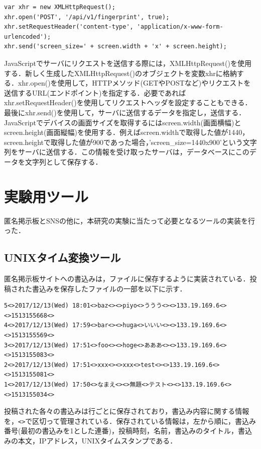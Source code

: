 \documentclass[10pt, a4paper]{jreport}
\begin{document}
\begin{lstlisting}[caption=画面サイズの取得とサーバへの送信,label=prog: fingerprint_js]
var xhr = new XMLHttpRequest();
xhr.open('POST', '/api/v1/fingerprint', true);
xhr.setRequestHeader('content-type', 'application/x-www-form-urlencoded');
xhr.send('screen_size=' + screen.width + 'x' + screen.height);
\end{lstlisting}

JavaScriptでサーバにリクエストを送信する際には，XMLHttpRequest()を使用する．新しく生成したXMLHttpRequest()のオブジェクトを変数xhrに格納する．xhr.open()を使用して，HTTPメソッド(GETやPOSTなど)やリクエストを送信するURL(エンドポイント)を指定する．必要であればxhr.setRequestHeader()を使用してリクエストヘッダを設定することもできる．最後にxhr.send()を使用して，サーバに送信するデータを指定し，送信する．JavaScriptでデバイスの画面サイズを取得するにはscreen.width(画面横幅)とscreen.height(画面縦幅)を使用する．例えばscreen.widthで取得した値が1440，screen.heightで取得した値が900であった場合，'screen\_size=1440x900'という文字列をサーバに送信する．この情報を受け取ったサーバは，データベースにこのデータを文字列として保存する．

\section{実験用ツール}
匿名掲示板とSNSの他に，本研究の実験に当たって必要となるツールの実装を行った．

\subsection{UNIXタイム変換ツール}\label{sec: unix_time_translation}
匿名掲示板サイトへの書込みは，ファイルに保存するように実装されている．投稿された書込みを保存したファイルの一部を以下に示す．

\begin{verbatim}
5<>2017/12/13(Wed) 18:01<>baz<><>piyo<>ううう<><>133.19.169.6<><>1513155668<>
4<>2017/12/13(Wed) 17:59<>bar<><>huga<>いいい<><>133.19.169.6<><>1513155569<>
3<>2017/12/13(Wed) 17:51<>foo<><>hoge<>あああ<><>133.19.169.6<><>1513155083<>
2<>2017/12/13(Wed) 17:51<>xxx<><>xxx<>test<><>133.19.169.6<><>1513155081<>
1<>2017/12/13(Wed) 17:50<>なまえ<><>無題<>テスト<><>133.19.169.6<><>1513155034<>
\end{verbatim}

投稿された各々の書込みは行ごとに保存されており，書込み内容に関する情報を，\verb|<>|で区切って管理されている．保存されている情報は，左から順に，書込み番号(最初の書込みを1とした連番)，投稿時刻，名前，書込みのタイトル，書込みの本文，IPアドレス，UNIXタイムスタンプである．
\end{document}
